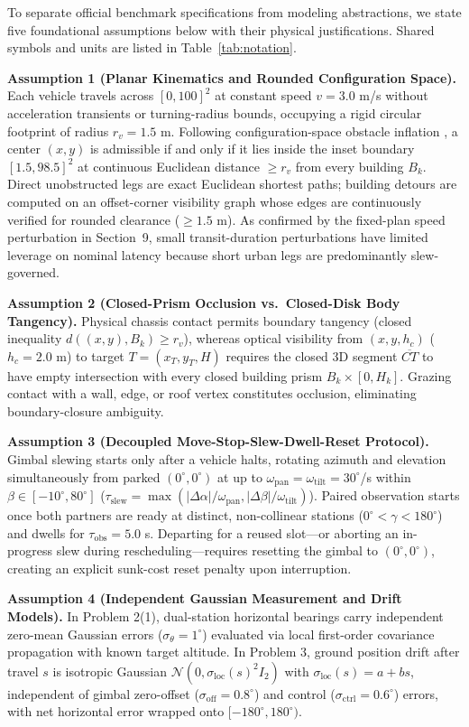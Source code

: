 To separate official benchmark specifications \cite{problem} from modeling abstractions, we state five foundational assumptions below with their physical justifications. Shared symbols and units are listed in Table~\ref{tab:notation}.

\textbf{Assumption 1 (Planar Kinematics and Rounded Configuration Space).} Each vehicle travels across $[0,100]^2$ at constant speed $v=3.0$ m/s without acceleration transients or turning-radius bounds, occupying a rigid circular footprint of radius $r_v=1.5$ m. Following configuration-space obstacle inflation \cite{lozano1983}, a center $(x,y)$ is admissible if and only if it lies inside the inset boundary $[1.5,98.5]^2$ at continuous Euclidean distance $\ge r_v$ from every building $B_k$. Direct unobstructed legs are exact Euclidean shortest paths; building detours are computed on an offset-corner visibility graph whose edges are continuously verified for rounded clearance ($\ge 1.5$ m). As confirmed by the fixed-plan speed perturbation in Section~9, small transit-duration perturbations have limited leverage on nominal latency because short urban legs are predominantly slew-governed.

\textbf{Assumption 2 (Closed-Prism Occlusion vs.\ Closed-Disk Body Tangency).} Physical chassis contact permits boundary tangency (closed inequality $d((x,y),B_k)\ge r_v$), whereas optical visibility from $(x,y,h_c)$ ($h_c=2.0$ m) to target $T=(x_T,y_T,H)$ requires the closed 3D segment $\overline{CT}$ to have empty intersection with every closed building prism $B_k\times[0,H_k]$. Grazing contact with a wall, edge, or roof vertex constitutes occlusion, eliminating boundary-closure ambiguity.

\textbf{Assumption 3 (Decoupled Move-Stop-Slew-Dwell-Reset Protocol).} Gimbal slewing starts only after a vehicle halts, rotating azimuth and elevation simultaneously from parked $(0^\circ,0^\circ)$ at up to $\omega_{\mathrm{pan}}=\omega_{\mathrm{tilt}}=30^\circ$/s within $\beta\in[-10^\circ,80^\circ]$ ($\tau_{\mathrm{slew}}=\max(|\Delta\alpha|/\omega_{\mathrm{pan}},|\Delta\beta|/\omega_{\mathrm{tilt}})$). Paired observation starts once both partners are ready at distinct, non-collinear stations ($0^\circ<\gamma<180^\circ$) and dwells for $\tau_{\mathrm{obs}}=5.0$ s. Departing for a reused slot—or aborting an in-progress slew during rescheduling—requires resetting the gimbal to $(0^\circ,0^\circ)$, creating an explicit sunk-cost reset penalty upon interruption.

\textbf{Assumption 4 (Independent Gaussian Measurement and Drift Models).} In Problem 2(1), dual-station horizontal bearings carry independent zero-mean Gaussian errors ($\sigma_\theta=1^\circ$) evaluated via local first-order covariance propagation with known target altitude. In Problem 3, ground position drift after travel $s$ is isotropic Gaussian $\mathcal{N}(0,\sigma_{\mathrm{loc}}(s)^2 I_2)$ with $\sigma_{\mathrm{loc}}(s)=a+bs$, independent of gimbal zero-offset ($\sigma_{\mathrm{off}}=0.8^\circ$) and control ($\sigma_{\mathrm{ctrl}}=0.6^\circ$) errors, with net horizontal error wrapped onto $[-180^\circ,180^\circ)$.


